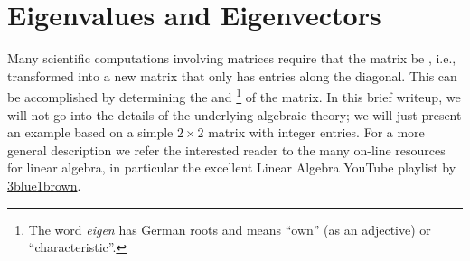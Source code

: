 \section{Eigenvalues and Eigenvectors}\label{\chabbr:sec:eigen}
Many scientific computations involving matrices require that the matrix be , i.e., transformed into a new matrix that only has entries along the diagonal.  This can be accomplished by determining the  and \footnote{The word \textit{eigen} has German roots and means ``own'' (as an adjective) or ``characteristic''.} of the matrix.  In this brief writeup, we will not go into the details of the underlying algebraic theory; we will just present an example based on a simple $2\times 2$ matrix with integer entries. For a more general description we refer the interested reader to the many on-line resources for linear algebra, in particular the excellent Linear Algebra YouTube playlist by {\color{OCblue}\href{https://www.3blue1brown.com/topics/linear-algebra}{3blue1brown}}.

